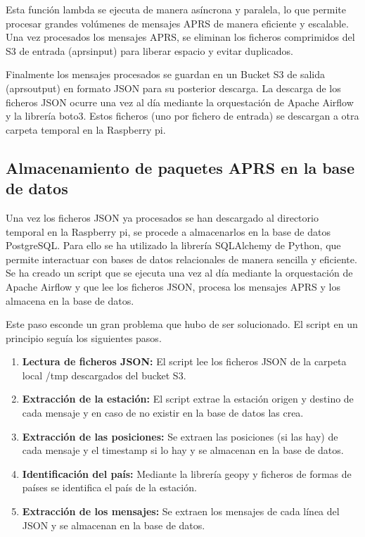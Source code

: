 \noindent Esta función lambda  se ejecuta de manera asíncrona y paralela, lo que permite procesar grandes volúmenes de mensajes APRS de manera eficiente y escalable. Una vez procesados los mensajes APRS, se eliminan los ficheros comprimidos del S3 de entrada (aprsinput) para liberar espacio y evitar duplicados.

Finalmente los mensajes procesados se guardan en un Bucket S3 de salida (aprsoutput) en formato JSON para su posterior descarga. La descarga de los ficheros JSON ocurre una vez al día mediante la orquestación de Apache Airflow y la librería boto3. Estos ficheros (uno por fichero de entrada) se descargan a otra carpeta temporal en la Raspberry pi.



\subsection*{Almacenamiento de paquetes APRS en la base de datos}

Una vez los ficheros JSON ya procesados se han descargado al directorio temporal en la Raspberry pi, se procede a almacenarlos en la base de datos PostgreSQL. Para ello se ha utilizado la librería SQLAlchemy de Python, que permite interactuar con bases de datos relacionales de manera sencilla y eficiente. Se ha creado un script que se ejecuta una vez al día mediante la orquestación de Apache Airflow y que lee los ficheros JSON, procesa los mensajes APRS y los almacena en la base de datos.

Este paso esconde un gran problema que hubo de ser solucionado. El script en un principio seguía los siguientes pasos.

\begin{enumerate}
	\item \textbf{Lectura de ficheros JSON:} El script lee los ficheros JSON de la carpeta local /tmp descargados del bucket S3.
	\item \textbf{Extracción de la estación:} El script extrae la estación origen y destino de cada mensaje y en caso de no existir en la base de datos las crea.
	\item \textbf{Extracción de las posiciones:} Se extraen las posiciones (si las hay) de cada mensaje y el timestamp si lo hay y se almacenan en la base de datos.
	\item \textbf{Identificación del país:} Mediante la librería geopy y ficheros de formas de países se identifica el país de la estación.
	\item \textbf{Extracción de los mensajes:} Se extraen los mensajes de cada línea del JSON y se almacenan en la base de datos.
\end{enumerate}

